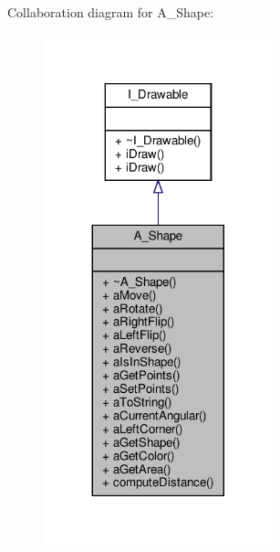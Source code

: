 Collaboration diagram for A\+\_\+\+Shape\+:\nopagebreak
\begin{figure}[H]
\begin{center}
\leavevmode
\includegraphics[width=188pt]{classA__Shape__coll__graph}
\end{center}
\end{figure}
